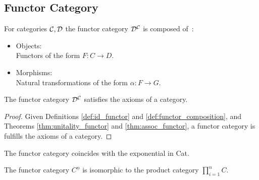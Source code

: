 \subsection{Functor Category}
\begin{definition}
  For categories $\mathcal{C}, \mathcal{D}$ the functor category $\mathcal{D}^{\mathcal{C}}$ is composed
  of~\parencite[p.~30]{leinster:basic_category_theory}:

  \begin{itemize}
    \item Objects:\\
      Functors of the form $F:C\to D$.
    \item Morphisms:\\
      Natural transformations of the form $\alpha:F\to G$.
  \end{itemize}
\end{definition}

\begin{theorem}
  The functor category $\mathcal{D}^{\mathcal{C}}$ satisfies the axioms of a category.

  \begin{proof}
    Given Definitions \ref{def:id_functor} and \ref{def:functor_composition},
    and Theorems \ref{thm:unitality_functor} and \ref{thm:assoc_functor}, a
    functor category is fulfills the axioms of a category.
  \end{proof}
\end{theorem}

\begin{remark}
  The functor category coincides with the exponential in Cat.
\end{remark}

\begin{remark}
  The functor category $C^{\underline{n}}$ is isomorphic to the product category
  $\prod_{i=1}^n C$.
\end{remark}